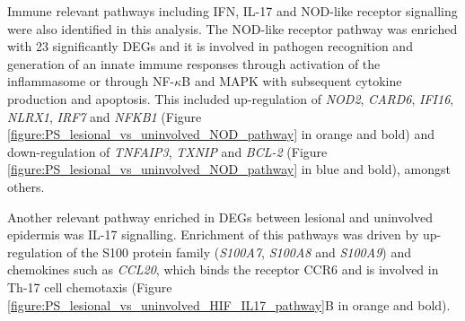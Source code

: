 Immune relevant pathways including IFN, IL-17 and NOD-like receptor signalling were also identified in this analysis. The NOD-like receptor pathway was enriched with 23 significantly DEGs and it is involved in pathogen recognition and generation of an innate immune responses through activation of the inflammasome or through NF-$\kappa$B and MAPK with subsequent cytokine production and apoptosis.  %
This included up-regulation of \textit{NOD2}, \textit{CARD6},  \textit{IFI16}, \textit{NLRX1}, \textit{IRF7} and \textit{NFKB1} (Figure \ref{figure:PS_lesional_vs_uninvolved_NOD_pathway} in orange and bold) and down-regulation of \textit{TNFAIP3}, \textit{TXNIP} and \textit{BCL-2} (Figure \ref{figure:PS_lesional_vs_uninvolved_NOD_pathway} in blue and bold), amongst others. %

Another relevant pathway enriched in DEGs between lesional and uninvolved epidermis was IL-17 signalling. Enrichment of this pathways was driven by up-regulation of the S100 protein family (\textit{S100A7}, \textit{S100A8} and \textit{S100A9}) and chemokines such as \textit{CCL20}, which binds the receptor CCR6 and is involved in Th-17 cell chemotaxis (Figure \ref{figure:PS_lesional_vs_uninvolved_HIF_IL17_pathway}B in orange and bold).

